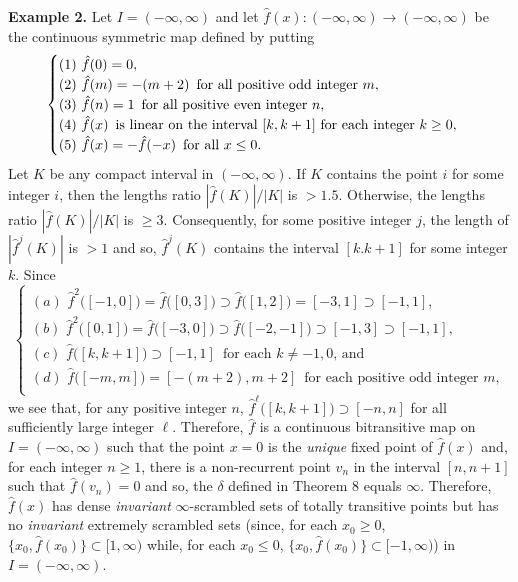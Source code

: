 \documentclass[12pt]{article}
\begin{document}
\noindent
{\bf Example 2.} Let $I = (-\infty, \infty)$ and let $\hat f(x) : (-\infty, \infty) \to (-\infty, \infty)$ be the continuous symmetric map defined by putting 
$$
\begin{cases}
(1) \,\, \hat f(0) = 0, \cr
(2) \,\, \hat f(m) = -(m+2) \,\,\, \text{for all positive odd integer $m$}, \cr
(3) \,\, \hat f(n) = 1 \,\,\, \text{for all positive even integer $n$}, \cr
(4) \,\, \hat f(x) \,\,\, \text{is linear on the interval $[k, k+1]$ for each integer $k \ge 0$}, \cr
(5) \,\, \hat f(x) = -\hat f(-x) \,\,\, \text{for all $x \le 0$}. \cr
\end{cases}
$$
\indent Let $K$ be any compact interval in $(-\infty, \infty)$.  If $K$ contains the point $i$ for some integer $i$, then the lengths ratio $|\hat f(K)|/|K|$ is $> 1.5$.  Otherwise, the lengths ratio $|\hat f(K)|/|K|$ is $\ge 3$.  Consequently, for some positive integer $j$, the length of $|\hat f^j(K)|$ is $> 1$ and so, ${\hat f}^j(K)$ contains the interval $[k. k+1]$ for some integer $k$.  Since 
$$
\begin{cases}
(a) \,\, \hat f^2\big([-1, 0]\big) = \hat f\big([0, 3]\big) \supset \hat f\big([1, 2]\big) = [-3, 1] \supset [-1, 1], \\
(b) \,\, \hat f^2\big([0, 1]\big) = \hat f\big([-3, 0]\big) \supset \hat f\big([-2, -1]\big) \supset [-1, 3] \supset [-1, 1], \\
(c) \,\, \hat f\big([k, k+1]\big) \supset [-1, 1] \,\,\, \text{for each $k \ne -1, 0$, and} \\
(d) \,\, \hat f\big([-m, m]\big) = [-(m+2), m+2] \,\,\, \text{for each positive odd integer $m$},\\
\end{cases}
$$
we see that, for any positive integer $n$, $\hat f^\ell\big([k, k+1]\big) \supset [-n, n]$ for all sufficiently large integer $\ell$.  Therefore, $\hat f$ is a continuous bitransitive map on $I = (-\infty, \infty)$ such that the point $x = 0$ is the {\it unique} fixed point of $\hat f(x)$ and, for each integer $n \ge 1$, there is a non-recurrent point $v_n$ in the interval $[n, n+1]$ such that $\hat f(v_n) = 0$ and so, the $\delta$ defined in Theorem 8 equals $\infty$.  Therefore, $\hat f(x)$ has dense {\it invariant} $\infty$-scrambled sets of totally transitive points but has no {\it invariant} extremely scrambled sets \big(since, for each $x_0 \ge 0$, $\big\{ x_0, \hat f(x_0) \big\} \subset [1, \infty)$ while, for each $x_0 \le 0$, $\big\{ x_0, \hat f(x_0) \big\} \subset [-1, \infty)$\big) in $I = (-\infty, \infty)$.  
\end{document}
